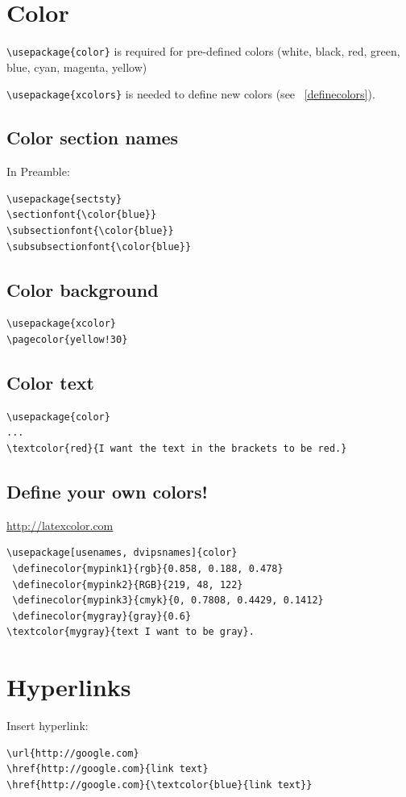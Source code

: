 \documentclass{article}
\begin{document}
\section{Color}\label{color}

\verb|\usepackage{color}| is required for
pre-defined colors (white, black, red, green, blue, cyan, magenta, yellow)

\verb|\usepackage{xcolors}|
is needed to define new colors (see \SS{}~\ref{definecolors}).

\subsection{Color section names}
In Preamble:
\begin{verbatim}
\usepackage{sectsty}
\sectionfont{\color{blue}}
\subsectionfont{\color{blue}}
\subsubsectionfont{\color{blue}}
\end{verbatim}

\subsection{Color background }
\begin{verbatim}
\usepackage{xcolor}
\pagecolor{yellow!30}
\end{verbatim}

\subsection{Color text}
\begin{verbatim}
\usepackage{color}
...
\textcolor{red}{I want the text in the brackets to be red.}
\end{verbatim}

\subsection{Define your own colors!}\label{ssec:definecolors}
\url{http://latexcolor.com}
\begin{verbatim}
\usepackage[usenames, dvipsnames]{color}
 \definecolor{mypink1}{rgb}{0.858, 0.188, 0.478}
 \definecolor{mypink2}{RGB}{219, 48, 122}
 \definecolor{mypink3}{cmyk}{0, 0.7808, 0.4429, 0.1412}
 \definecolor{mygray}{gray}{0.6}
\textcolor{mygray}{text I want to be gray}.
\end{verbatim}

\section{Hyperlinks}
Insert hyperlink:
\begin{verbatim}
\url{http://google.com}
\href{http://google.com}{link text}
\href{http://google.com}{\textcolor{blue}{link text}}
\end{verbatim}
\end{document}
